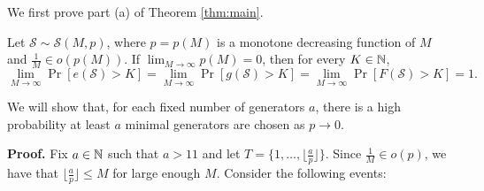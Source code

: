 We first prove part (a) of Theorem \ref{thm:main}. 

\begin{lemma}\label{lem:lowerbound}
    Let $\mathcal{S} \sim \mathcal{S}(M, p)$, where $p = p(M)$ is a monotone decreasing function of $M$ and $\frac{1}{M} \in o(p(M))$. If $\lim_{M \to \infty} p(M) = 0$, then for every $K \in \mathbb{N}$,   
    \[\lim_{M \to \infty} \Pr[e(\mathcal{S}) > K] = \lim_{M \to \infty} \Pr[g(\mathcal{S}) > K] = \lim_{M \to \infty} \Pr[F(\mathcal{S}) > K] = 1.\]
\end{lemma}

We will show that, for each fixed number of generators $a$, there is a high probability at least $a$ minimal generators are chosen as $p \to 0$.

\textbf{Proof. }
Fix $a \in \mathbb{N}$ such that $a > 11$ and let $T = \{1, \ldots, \lfloor\frac{a}{p}\rfloor\}$. Since   $\frac{1}{M} \in o(p)$, we have that $\lfloor\frac{a}{p}\rfloor \leq M$ for large enough $M$. Consider the following events:
